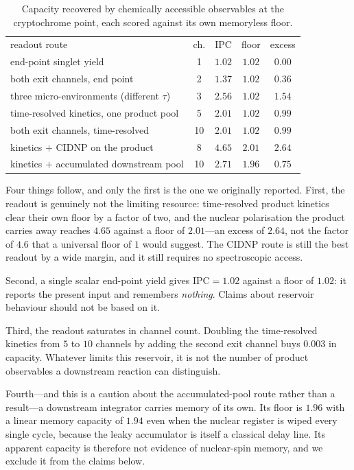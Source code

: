\documentclass[aps,prx,reprint,superscriptaddress,nofootinbib,floatfix]{revtex4-2}
\begin{document}
\begin{table}[htbp]
\caption{\label{tab:routes_main}Capacity recovered by chemically accessible observables at the cryptochrome point, each scored against its own memoryless floor.}
\begin{ruledtabular}
\begin{tabular}{lcccc}
readout route & ch. & IPC & floor & excess \\
end-point singlet yield & 1 & $1.02$ & $1.02$ & $0.00$ \\
both exit channels, end point & 2 & $1.37$ & $1.02$ & $0.36$ \\
three micro-environments (different $\tau$) & 3 & $2.56$ & $1.02$ & $1.54$ \\
time-resolved kinetics, one product pool & 5 & $2.01$ & $1.02$ & $0.99$ \\
both exit channels, time-resolved & 10 & $2.01$ & $1.02$ & $0.99$ \\
kinetics $+$ CIDNP on the product & 8 & $\mathbf{4.65}$ & $2.01$ & $\mathbf{2.64}$ \\
kinetics $+$ accumulated downstream pool & 10 & $2.71$ & $1.96$ & $0.75$ \\
\end{tabular}
\end{ruledtabular}
\end{table}

Four things follow, and only the first is the one we originally reported.
First, the readout is genuinely not the limiting resource: time-resolved product
kinetics clear their own floor by a factor of two, and the nuclear polarisation
the product carries away reaches $4.65$ against a floor of $2.01$---an excess of
$2.64$, not the factor of $4.6$ that a universal floor of $1$ would suggest. The
CIDNP route is still the best readout by a wide margin, and it still requires no
spectroscopic access.

Second, a single scalar end-point yield gives $\mathrm{IPC}=1.02$ against a floor
of $1.02$: it reports the present input and remembers \emph{nothing}. Claims about
reservoir behaviour should not be based on it.

Third, the readout saturates in channel count. Doubling the time-resolved
kinetics from $5$ to $10$ channels by adding the second exit channel buys
$0.003$ in capacity. Whatever limits this reservoir, it is not the number of
product observables a downstream reaction can distinguish.

Fourth---and this is a caution about the accumulated-pool route rather than a
result---a downstream integrator carries memory of its own. Its floor is $1.96$
with a linear memory capacity of $1.94$ even when the nuclear register is wiped
every single cycle, because the leaky accumulator is itself a classical delay
line. Its apparent capacity is therefore not evidence of nuclear-spin memory, and
we exclude it from the claims below.
\end{document}
